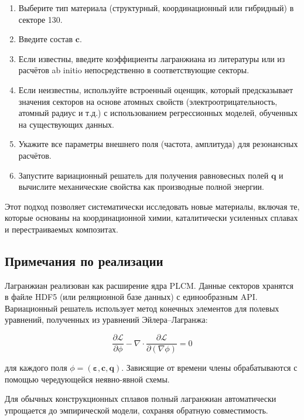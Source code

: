 \documentclass[12pt,a4paper]{article}
\begin{document}
	\begin{enumerate}
		\item Выберите тип материала (структурный, координационный или гибридный) в секторе 130.
		\item Введите состав \(\mathbf{c}\).
		\item Если известны, введите коэффициенты лагранжиана из литературы или из расчётов ab initio непосредственно в соответствующие секторы.
		\item Если неизвестны, используйте встроенный оценщик, который предсказывает значения секторов на основе атомных свойств (электроотрицательность, атомный радиус и т.д.) с использованием регрессионных моделей, обученных на существующих данных.
		\item Укажите все параметры внешнего поля (частота, амплитуда) для резонансных расчётов.
		\item Запустите вариационный решатель для получения равновесных полей \(\mathbf{q}\) и вычислите механические свойства как производные полной энергии.
	\end{enumerate}
	
	Этот подход позволяет систематически исследовать новые материалы, включая те, которые основаны на координационной химии, каталитически усиленных сплавах и перестраиваемых композитах.
	
	\subsection{Примечания по реализации}
	\label{subsec:implementation}
	
	Лагранжиан реализован как расширение ядра PLCM. Данные секторов хранятся в файле HDF5 (или реляционной базе данных) с единообразным API. Вариационный решатель использует метод конечных элементов для полевых уравнений, полученных из уравнений Эйлера–Лагранжа:
	
	\[
	\frac{\partial \mathcal{L}}{\partial \phi} - \nabla \cdot \frac{\partial \mathcal{L}}{\partial (\nabla\phi)} = 0
	\]
	
	для каждого поля \(\phi = (\boldsymbol{\varepsilon}, \mathbf{c}, \mathbf{q})\). Зависящие от времени члены обрабатываются с помощью чередующейся неявно-явной схемы.
	
	Для обычных конструкционных сплавов полный лагранжиан автоматически упрощается до эмпирической модели, сохраняя обратную совместимость.
	
	
\end{document}

